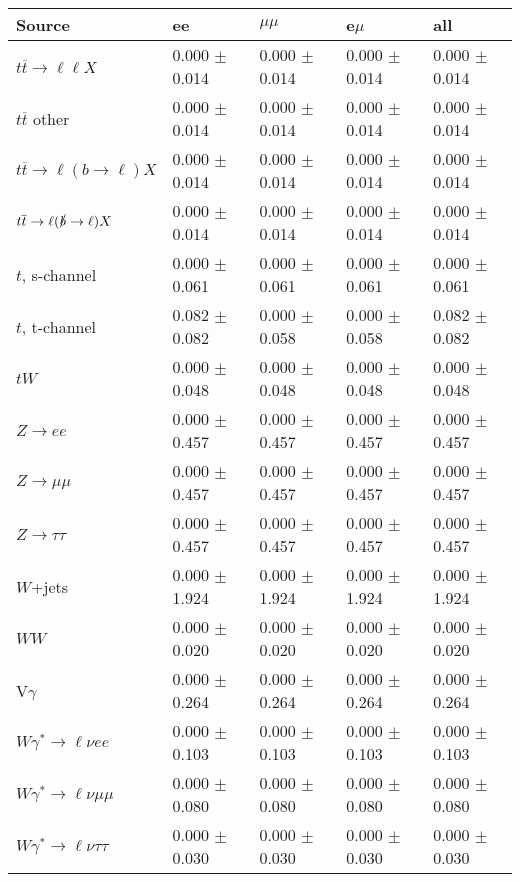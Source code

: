 \begin{tabular}{l | l l l l}
\hline\hline
 Source  &  ee  &  $\mu\mu$  &  e$\mu$  &  all \\
\hline
$t\overline{t}\rightarrow \ell\ell X$ &  0.000 $\pm$  0.014 &  0.000 $\pm$  0.014 &  0.000 $\pm$  0.014 &  0.000 $\pm$  0.014\\
$t\overline{t}$ other &  0.000 $\pm$  0.014 &  0.000 $\pm$  0.014 &  0.000 $\pm$  0.014 &  0.000 $\pm$  0.014\\
$t\overline{t}\rightarrow \ell(b\rightarrow \ell)X$ &  0.000 $\pm$  0.014 &  0.000 $\pm$  0.014 &  0.000 $\pm$  0.014 &  0.000 $\pm$  0.014\\
$t\overline{t}\rightarrow \ell(\slashed{b}\rightarrow \ell)X$ &  0.000 $\pm$  0.014 &  0.000 $\pm$  0.014 &  0.000 $\pm$  0.014 &  0.000 $\pm$  0.014\\
\hline
$t$, s-channel &  0.000 $\pm$  0.061 &  0.000 $\pm$  0.061 &  0.000 $\pm$  0.061 &  0.000 $\pm$  0.061\\
$t$, t-channel &  0.082 $\pm$  0.082 &  0.000 $\pm$  0.058 &  0.000 $\pm$  0.058 &  0.082 $\pm$  0.082\\
$tW$ &  0.000 $\pm$  0.048 &  0.000 $\pm$  0.048 &  0.000 $\pm$  0.048 &  0.000 $\pm$  0.048\\
\hline
$Z\rightarrow ee$ &  0.000 $\pm$  0.457 &  0.000 $\pm$  0.457 &  0.000 $\pm$  0.457 &  0.000 $\pm$  0.457\\
$Z\rightarrow\mu\mu$ &  0.000 $\pm$  0.457 &  0.000 $\pm$  0.457 &  0.000 $\pm$  0.457 &  0.000 $\pm$  0.457\\
$Z\rightarrow\tau\tau$ &  0.000 $\pm$  0.457 &  0.000 $\pm$  0.457 &  0.000 $\pm$  0.457 &  0.000 $\pm$  0.457\\
$W$+jets &  0.000 $\pm$  1.924 &  0.000 $\pm$  1.924 &  0.000 $\pm$  1.924 &  0.000 $\pm$  1.924\\
$WW$ &  0.000 $\pm$  0.020 &  0.000 $\pm$  0.020 &  0.000 $\pm$  0.020 &  0.000 $\pm$  0.020\\
\hline
V$\gamma$ &  0.000 $\pm$  0.264 &  0.000 $\pm$  0.264 &  0.000 $\pm$  0.264 &  0.000 $\pm$  0.264\\
$W\gamma^{*}\rightarrow\ell\nu e e$ &  0.000 $\pm$  0.103 &  0.000 $\pm$  0.103 &  0.000 $\pm$  0.103 &  0.000 $\pm$  0.103\\
$W\gamma^{*}\rightarrow\ell\nu\mu\mu$ &  0.000 $\pm$  0.080 &  0.000 $\pm$  0.080 &  0.000 $\pm$  0.080 &  0.000 $\pm$  0.080\\
$W\gamma^{*}\rightarrow\ell\nu\tau\tau$ &  0.000 $\pm$  0.030 &  0.000 $\pm$  0.030 &  0.000 $\pm$  0.030 &  0.000 $\pm$  0.030\\

\end{tabular}
